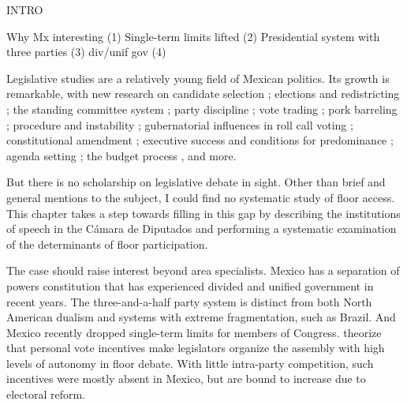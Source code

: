 INTRO


Why Mx interesting
(1) Single-term limits lifted
(2) Presidential system with three parties
(3) div/unif gov
(4) 


Legislative studies are a relatively young field of Mexican politics. Its growth is remarkable, with new research on candidate selection \citep{ascencio.kerevel.cand-sel-beh.2021}; elections and redistricting \citep{magar.altman.mcd.trelles2016pg}; the standing committee system \citep{bejar.Comisiones2009ed.book}; party discipline \citep{tellez-del-rio.2018}; vote trading \citep{lopez.lara.aldf2013}; pork barreling \citep{kerevelPork2015}; procedure and instability \citep{heller.weldon.2003}; gubernatorial influences in roll call voting \citep{rosas.langston.2011}; constitutional amendment \citep{casar.marvan2014book}; executive success \citep{bejarQuienLegisla2012} and conditions for predominance \citep{weldon.1997}; agenda setting \citep{casar.agsetting.2016}; the budget process \citep{weldon.2002}, and more.

But there is no scholarship on legislative debate in sight. Other than brief and general mentions to the subject, I could find no systematic study of floor access. This chapter takes a step towards filling in this gap by describing the institutions of speech in the Cámara de Diputados and performing a systematic examination of the determinants of floor participation.

The case should raise interest beyond area specialists. Mexico has a separation of powers constitution that has experienced divided and unified government in recent years. The three-and-a-half party system is distinct from both North American dualism and systems with extreme fragmentation, such as Brazil. And Mexico recently dropped single-term limits for members of Congress. \citet{proksch-slapin2015book} theorize that personal vote incentives make legislators organize the assembly with high levels of autonomy in floor debate. With little intra-party competition, such incentives were mostly absent in Mexico, but are bound to increase due to electoral reform. 


